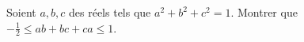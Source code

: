 Soient $a, b, c$ des réels tels que $a^2 + b^2 + c^2 = 1$. Montrer que $-\frac{1}{2} \leq ab + bc + ca \leq 1$.
